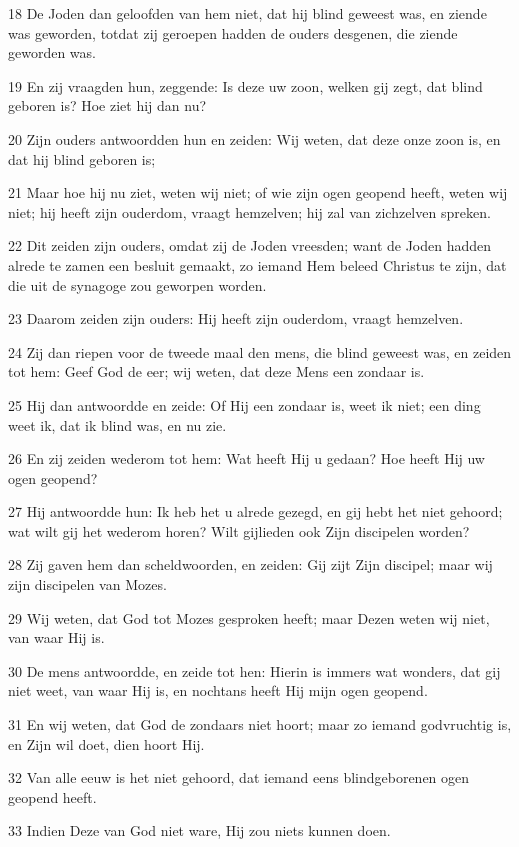 \par 18 De Joden dan geloofden van hem niet, dat hij blind geweest was, en ziende was geworden, totdat zij geroepen hadden de ouders desgenen, die ziende geworden was.
\par 19 En zij vraagden hun, zeggende: Is deze uw zoon, welken gij zegt, dat blind geboren is? Hoe ziet hij dan nu?
\par 20 Zijn ouders antwoordden hun en zeiden: Wij weten, dat deze onze zoon is, en dat hij blind geboren is;
\par 21 Maar hoe hij nu ziet, weten wij niet; of wie zijn ogen geopend heeft, weten wij niet; hij heeft zijn ouderdom, vraagt hemzelven; hij zal van zichzelven spreken.
\par 22 Dit zeiden zijn ouders, omdat zij de Joden vreesden; want de Joden hadden alrede te zamen een besluit gemaakt, zo iemand Hem beleed Christus te zijn, dat die uit de synagoge zou geworpen worden.
\par 23 Daarom zeiden zijn ouders: Hij heeft zijn ouderdom, vraagt hemzelven.
\par 24 Zij dan riepen voor de tweede maal den mens, die blind geweest was, en zeiden tot hem: Geef God de eer; wij weten, dat deze Mens een zondaar is.
\par 25 Hij dan antwoordde en zeide: Of Hij een zondaar is, weet ik niet; een ding weet ik, dat ik blind was, en nu zie.
\par 26 En zij zeiden wederom tot hem: Wat heeft Hij u gedaan? Hoe heeft Hij uw ogen geopend?
\par 27 Hij antwoordde hun: Ik heb het u alrede gezegd, en gij hebt het niet gehoord; wat wilt gij het wederom horen? Wilt gijlieden ook Zijn discipelen worden?
\par 28 Zij gaven hem dan scheldwoorden, en zeiden: Gij zijt Zijn discipel; maar wij zijn discipelen van Mozes.
\par 29 Wij weten, dat God tot Mozes gesproken heeft; maar Dezen weten wij niet, van waar Hij is.
\par 30 De mens antwoordde, en zeide tot hen: Hierin is immers wat wonders, dat gij niet weet, van waar Hij is, en nochtans heeft Hij mijn ogen geopend.
\par 31 En wij weten, dat God de zondaars niet hoort; maar zo iemand godvruchtig is, en Zijn wil doet, dien hoort Hij.
\par 32 Van alle eeuw is het niet gehoord, dat iemand eens blindgeborenen ogen geopend heeft.
\par 33 Indien Deze van God niet ware, Hij zou niets kunnen doen.
